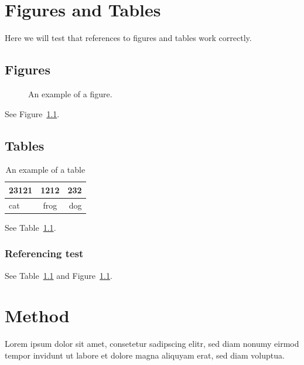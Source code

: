 \documentclass[a4paper,11pt,phdthesis,singlespace,twoside]{cssethesis}
\begin{document}
\chapter{Figures and Tables}
Here we will test that references to figures and tables work correctly.

\section{Figures}
\begin{figure}[ht]
\begin{center}
\end{center}
\caption{An example of a figure.}
\label{fig:example}
\end{figure}
See Figure~\ref{fig:example}.

\section{Tables}
\begin{table}
\begin{center}
\begin{tabular}{lcr}
23121 & 1212 & 232 \\ \hline  
cat & frog & dog
\end{tabular}
\end{center}
\caption{An example of a table}
\label{tab:example}
\end{table}
See Table~\ref{tab:example}.

\subsection{Referencing test}
See Table~\ref{tab:example} and Figure~\ref{fig:example}.

\chapter{Method}
Lorem ipsum dolor sit amet, consetetur sadipscing elitr,  sed diam nonumy
eirmod tempor invidunt ut labore et dolore magna aliquyam erat, sed diam
voluptua. 
\end{document}
